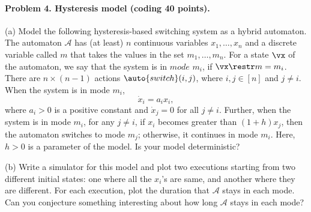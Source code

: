 \documentclass[11pt]{article}
\newcommand{\A}[0]{\mathcal{A}}
\begin{document}
\paragraph{Problem 4. Hysteresis model (coding 40 points).}
(a) Model the following hysteresis-based switching system as a hybrid automaton. The automaton $\A$ has (at least) $n$ continuous variables $x_1,\ldots,x_n$ and a discrete variable called $m$ that takes the values in the set $m_1,\ldots, m_n$. For a state $\vx$ of the automaton, we say that the system is in $\mathit{mode}$ $m_i$, if $\vx \restr m =  m_i$. There are $n \times (n-1)$ actions $\auto{switch}(i,j)$, where $i, j \in [n]$ and $j\neq i$. When the system is in mode $m_i$,
\[
 \dot{x}_i=a_i x_i,
\]
where $a_i>0$ is a positive constant and $\dot{x}_j =0$ for all $j \neq i$. Further, when the system is in mode $m_i$, for any $j \neq  i$, if $x_i$ becomes greater than $(1+h)x_j$, then the automaton switches to mode $m_j$; otherwise, it continues in mode $m_i$. Here, $h > 0$ is a parameter of the model. Is your model deterministic?

(b) Write a simulator for this model and plot two executions starting from two different initial states: one where all the $x_i$'s are same, and another where they are different. For each execution, plot the duration that $\A$ stays in each mode. Can you conjecture something interesting about how long $\A$ stays in each mode?
\end{document}
